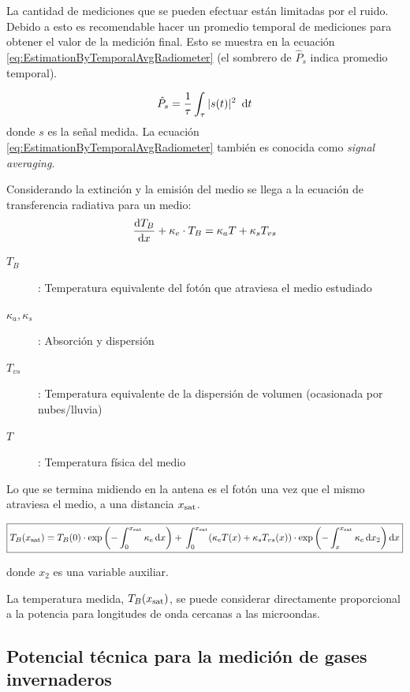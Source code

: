\documentclass[11pt,titlepage]{article}
\begin{document}
La cantidad de mediciones que se pueden efectuar están limitadas por el ruido. Debido a esto es recomendable hacer un promedio temporal de mediciones para obtener el valor de la medición final. Esto se muestra en la ecuaci\'on \eqref{eq:EstimationByTemporalAvgRadiometer} (el sombrero de $\hat{P}_s$ indica promedio temporal).

\begin{equation} \label{eq:EstimationByTemporalAvgRadiometer}
    \hat{P}_s = \frac{1}{\tau} \int_\tau |s(t)|^2 ~\operatorname{d}\!{t}
\end{equation}
donde \(s\) es la señal medida. La ecuaci\'on \eqref{eq:EstimationByTemporalAvgRadiometer} tambi\'en es conocida como \textit{signal averaging}.

Considerando la extinción y la emisión del medio se llega a la ecuación de transferencia radiativa para un medio:
\begin{equation}
    \frac{\operatorname{d}\!{T}_B}{\operatorname{d}\!{x}} + \kappa_e \cdot T_B = \kappa_a T + \kappa_s T_{vs}
\end{equation}

\begin{description}
    \item[\(T_B\)]: Temperatura equivalente del fotón que atraviesa el medio estudiado
    \item[\(\kappa_a,\kappa_s \)]: Absorción y dispersión
    \item[\(T_{vs}\)]: Temperatura equivalente de la dispersión de volumen (ocasionada por nubes/lluvia)
    \item[\(T\)]: Temperatura física del medio
\end{description}

Lo que se termina midiendo en la antena es el fotón una vez que el mismo atraviesa el medio, a una distancia $x_{{\tiny\textrm{sat}}}$.


\begin{equation}
   \boxed{ T_B(x_{\tiny\textrm{sat}}) = T_B(0) \cdot \exp \left( -\int_0^{x_{\tiny\textrm{sat}}} \kappa_e \operatorname{d}\!{x} \right) + \\ \int_0^{x_{\tiny\textrm{sat}}} (\kappa_e T(x) + \kappa_s T_{vs}(x))\cdot \exp\left( -\int_x^{x_{\tiny\textrm{sat}}}\kappa_e \operatorname{d}\!{x}_2\right) \operatorname{d}\!{x} }
\end{equation}

donde $x_2$ es una variable auxiliar.

La temperatura medida, $T_B(x_{{\tiny\textrm{sat}}})$, se puede considerar directamente proporcional a la potencia para longitudes de onda cercanas a las microondas.


\subsection[Medición de indicadores]{Potencial técnica para la medición de gases invernaderos}
\end{document}
